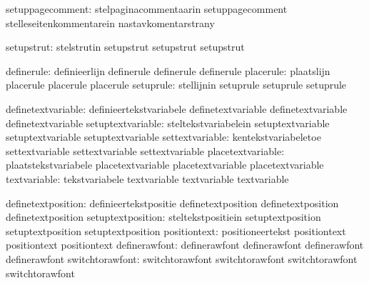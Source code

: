             setuppagecomment:  stelpaginacommentaarin       setuppagecomment
                                stelleseitenkommentarein     nastavkomentarstrany

                   setupstrut:  stelstrutin                  setupstrut
                                setupstrut                   setupstrut

                   definerule:  definieerlijn                definerule
                                definerule                   definerule
                    placerule:  plaatslijn                   placerule
                                placerule                    placerule
                    setuprule:  stellijnin                   setuprule
                                setuprule                    setuprule

           definetextvariable:  definieertekstvariabele      definetextvariable
                                definetextvariable           definetextvariable
            setuptextvariable:  steltekstvariabelein         setuptextvariable
                                setuptextvariable            setuptextvariable
              settextvariable:  kentekstvariabeletoe         settextvariable
                                settextvariable              settextvariable
            placetextvariable:  plaatstekstvariabele         placetextvariable
                                placetextvariable            placetextvariable
                 textvariable:  tekstvariabele               textvariable
                                textvariable                 textvariable

           definetextposition:  definieertekstpositie        definetextposition
                                definetextposition           definetextposition
            setuptextposition:  steltekstpositiein           setuptextposition  
                                setuptextposition            setuptextposition  
                 positiontext:  positioneertekst             positiontext
                                positiontext                 positiontext 
                definerawfont:  definerawfont                definerawfont
                                definerawfont                definerawfont
              switchtorawfont:  switchtorawfont              switchtorawfont
                                switchtorawfont              switchtorawfont

\stopcommands


